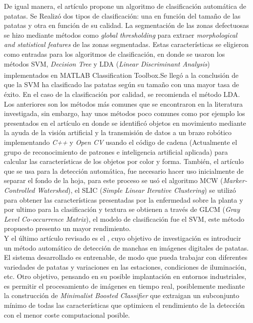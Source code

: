 	De igual manera, el artículo \cite{sobolu2020automatic} propone un algoritmo de clasificación automática de patatas. Se Realizó dos tipos de clasificación: una en función del tamaño de las patatas y otra en función de su calidad. La segmentación de las zonas defectuosas se hizo mediante métodos como \textit{global thresholding} para extraer \textit{morphological and statistical features} de las zonas segmentadas. Estas características se eligieron como entradas para los algoritmos de clasificación, en donde se usaron los métodos SVM, \textit{Decision  Tree} y LDA (\textit{Linear Discriminant Analysis}) implementados en MATLAB\textsuperscript{\textregistered} Classification Toolbox.Se llegó a la conclusión de que la SVM ha clasificado las patatas según su tamaño con una mayor tasa de éxito. En el caso de la clasificación por calidad, se recomienda el método LDA.\\
	
	Los anteriores son los métodos más comunes que se encontraron en la literatura investigada, sin embargo, hay unos métodos poco comunes como por ejemplo los presentados en el artículo \cite{article5} en donde se identificó objetos en movimiento mediante la ayuda de la visión artificial y la transmisión de datos a un brazo robótico implementando \textit{C++} y \textit{Open CV} usando el código de cadena (Actualmente el grupo de reconocimiento de patrones e inteligencia artificial aplicada) para calcular las características de los objetos por color y forma. También, el artículo \cite{7237209} que se usa para la detección automática, fue necesario hacer uso inicialmente de separar el fondo de la hoja, para este proceso se usó el algoritmo MCW (\textit{Marker-Controlled Watershed}), el SLIC (\textit{Simple Linear Iterative Clustering}) se utilizó para obtener las características presentadas por la enfermedad sobre la planta y por ultimo para la clasificación y textura se obtienen a través de GLCM (\textit{Gray Level Co-occurrence Matrix}), el modelo de clasificación fue el SVM, este método propuesto presento un mayor rendimiento.\\
	
	Y el último artículo revisado es el \cite{Barnes2010}, cuyo objetivo de  investigación es introducir un método automático de detección de manchas en imágenes digitales de patatas. El sistema desarrollado es entrenable, de modo que pueda trabajar con diferentes variedades de patatas y variaciones en las estaciones, condiciones de iluminación, etc. Otro objetivo, pensando en su posible implantación en entornos industriales, es permitir el procesamiento de imágenes en tiempo real, posiblemente mediante la construcción de \textit{Minimalist Boosted Classifier} que extraigan un subconjunto mínimo de todas las características que optimicen el rendimiento de la detección con el menor coste computacional posible.



